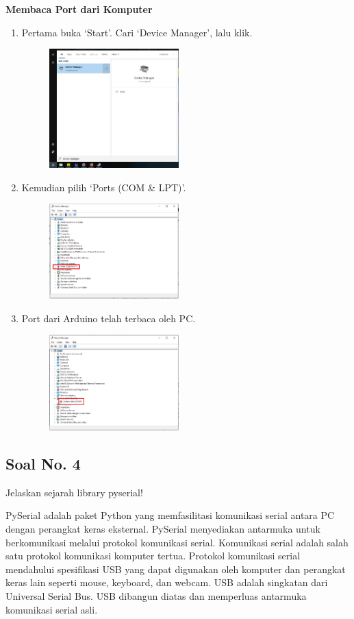 \textbf{Membaca Port dari Komputer}
\begin{enumerate}
	\item Pertama buka `Start'. Cari `Device Manager', lalu klik.
	\begin{figure}[H]
		\includegraphics[width=5cm]{figures/5/1154121/Teori/d1.png}
		\centering
	\end{figure}
	\item Kemudian pilih `Ports (COM \& LPT)'.
	\begin{figure}[H]
		\includegraphics[width=5cm]{figures/5/1154121/Teori/d3.png}
		\centering
	\end{figure}
	\item Port dari Arduino telah terbaca oleh PC.
	\begin{figure}[H]
		\includegraphics[width=5cm]{figures/5/1154121/Teori/d2.png}
		\centering
	\end{figure}
\end{enumerate}

\subsection{Soal No. 4}
Jelaskan sejarah library pyserial!

PySerial adalah paket Python yang memfasilitasi komunikasi serial antara PC dengan perangkat keras eksternal. PySerial menyediakan antarmuka untuk berkomunikasi melalui protokol komunikasi serial. Komunikasi serial adalah salah satu protokol komunikasi komputer tertua. Protokol komunikasi serial mendahului spesifikasi USB yang dapat digunakan oleh komputer dan perangkat keras lain seperti mouse, keyboard, dan webcam. USB adalah singkatan dari Universal Serial Bus. USB dibangun diatas dan memperluas antarmuka komunikasi serial asli.

